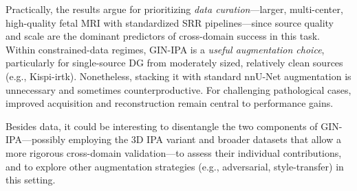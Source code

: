 Practically, the results argue for prioritizing \emph{data curation}---larger, multi-center, high-quality fetal MRI with standardized SRR pipelines---since source quality and scale are the dominant predictors of cross-domain success in this task. Within constrained-data regimes, GIN-IPA is a \emph{useful augmentation choice}, particularly for single-source DG from moderately sized, relatively clean sources (e.g., Kispi-irtk). Nonetheless, stacking it with standard nnU-Net augmentation is unnecessary and sometimes counterproductive. For challenging pathological cases, improved acquisition and reconstruction remain central to performance gains.

Besides data, it could be interesting to disentangle the two components of GIN-IPA---possibly employing the 3D IPA variant and broader datasets that allow a more rigorous cross-domain validation---to assess their individual contributions, and to explore other augmentation strategies (e.g., adversarial, style-transfer) in this setting.
